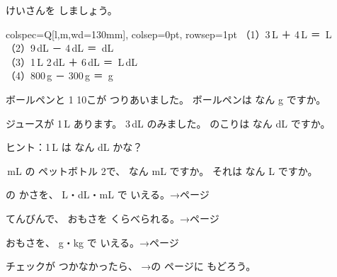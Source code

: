\bkproblem けいさんを しましょう。
\par
\noindent\hspace*{1\zw}\begin{tblr}{colspec={Q[l,m,wd=130mm]}, colsep=0pt, rowsep=1pt}
（1）3\,L ＋ 4\,L ＝ \bkkakikomi[13mm]\,L \\
（2）9\,dL － 4\,dL ＝ \bkkakikomi[13mm]\,dL \\
（3）1\,L 2\,dL ＋ 6\,dL ＝ \bkkakikomi\,L\enspace\bkkakikomi\,dL \\
（4）800\,g － 300\,g ＝ \bkkakikomi[16mm]\,g \\
\end{tblr}

\bkproblem ボールペンと \mbox{1} 10こが つりあいました。 ボールペンは なん g ですか。
\bkkotaeran
{}

\clearpage
{}

\bkproblem ジュースが 1\,L あります。 3\,dL のみました。 のこりは なん dL ですか。\par
{\small\color{bkOrange!58!black}ヒント：1\,L は なん dL かな？}
\bkshikiran
{}

\,mL の ペットボトル 2で、 なん mL ですか。 それは なん L ですか。
\bkshikiran[11\zw]

\begin{furikaeri}
\begin{checklist}
\item {}の かさを、 L・dL・mL で いえる。\hfill{\footnotesize\sffamily\color{bkTheme}→\pageref{bk:1-9:kasa}ページ}
\item てんびんで、 おもさを くらべられる。\hfill{\footnotesize\sffamily\color{bkTheme}→\pageref{bk:1-9:tenbin}ページ}
\item おもさを、 g・kg で いえる。\hfill{\footnotesize\sffamily\color{bkTheme}→\pageref{bk:1-9:g}ページ}
\end{checklist}
チェックが つかなかったら、 →の ページに もどろう。
\end{furikaeri}

\clearpage
